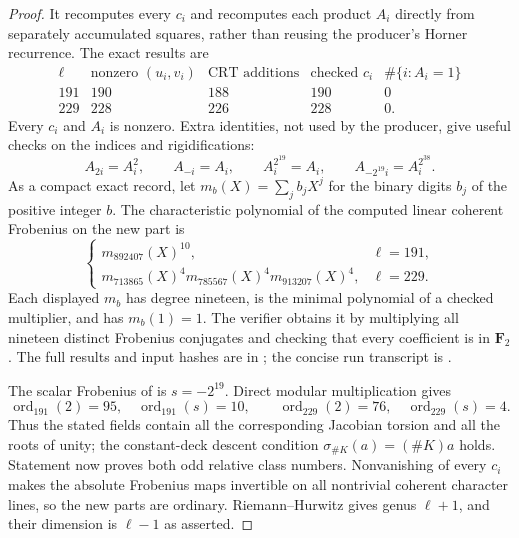 \begin{proof}
It recomputes every $c_i$ and recomputes each product $A_i$ directly
from separately accumulated squares, rather than reusing the
producer's Horner recurrence. The exact results are
\[
 \begin{array}{c|r|r|r|r}
 \ell&\text{nonzero }(u_i,v_i)&\text{CRT additions}&
                 \text{checked }c_i&\#\{i:A_i=1\}\\ \hline
 191&190&188&190&0\\
 229&228&226&228&0.
 \end{array}
\]
Every $c_i$ and $A_i$ is nonzero. Extra identities, not used by
the producer, give useful checks on the indices and rigidifications:
\[
 A_{2i}=A_i^2,\qquad A_{-i}=A_i,\qquad
 A_i^{2^{19}}=A_i,\qquad
 A_{-2^{19}i}=A_i^{2^{38}}.
\]
As a compact exact record, let $m_b(X)=\sum_j b_jX^j$ for the
binary digits $b_j$ of the positive integer $b$. The characteristic
polynomial of the computed linear coherent Frobenius on the new
part is
\[
 \begin{cases}
 m_{892407}(X)^{10},&\ell=191,\\
 m_{713865}(X)^4m_{785567}(X)^4m_{913207}(X)^4,&\ell=229.
 \end{cases}
\]
Each displayed $m_b$ has degree nineteen, is the minimal polynomial
of a checked multiplier, and has $m_b(1)=1$. The verifier obtains
it by multiplying all nineteen distinct Frobenius conjugates and
checking that every coefficient is in $\mathbf F_2$.
The full results and input hashes are in
; the concise run transcript is
.

The scalar Frobenius of  is $s=-2^{19}$.
Direct modular multiplication gives
\[
 \operatorname{ord}_{191}(2)=95,
 \quad\operatorname{ord}_{191}(s)=10,
 \qquad
 \operatorname{ord}_{229}(2)=76,
 \quad\operatorname{ord}_{229}(s)=4.
\]
Thus the stated fields contain all the corresponding Jacobian
torsion and all the roots of unity; the constant-deck descent
condition $\sigma_{\#K}(a)=(\#K)a$ holds. Statement
 now proves both odd relative class numbers.
Nonvanishing of every $c_i$ makes the absolute Frobenius maps
invertible on all nontrivial coherent character lines, so the
new parts are ordinary. Riemann--Hurwitz gives genus $\ell+1$,
and their dimension is $\ell-1$ as asserted.
\end{proof}

